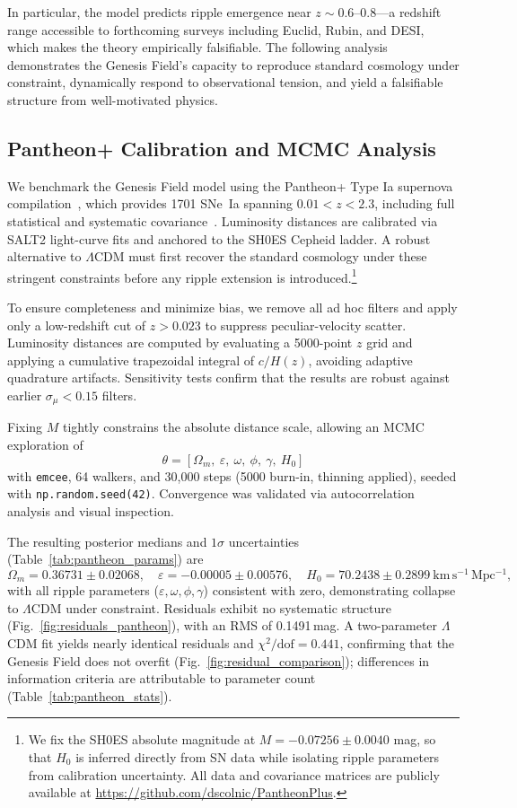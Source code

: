 In particular, the model predicts ripple emergence near $z \sim 0.6$–$0.8$—a redshift range accessible to forthcoming surveys including Euclid, Rubin, and DESI, which makes the theory empirically falsifiable. The following analysis demonstrates the Genesis Field's capacity to reproduce standard cosmology under constraint, dynamically respond to observational tension, and yield a falsifiable structure from well-motivated physics.

\subsection{Pantheon+ Calibration and MCMC Analysis}
\label{sec:pantheon}

We benchmark the Genesis Field model using the Pantheon+ Type Ia supernova compilation~\cite{Brout2022}, which provides 1701 SNe~Ia spanning $0.01 < z < 2.3$, including full statistical and systematic covariance~\cite{Scolnic2018}. Luminosity distances are calibrated via SALT2 light-curve fits and anchored to the SH0ES Cepheid ladder. A robust alternative to $\Lambda$CDM must first recover the standard cosmology under these stringent constraints before any ripple extension is introduced.\footnote{We fix the SH0ES absolute magnitude at $M = -0.07256 \pm 0.0040$ mag, so that $H_0$ is inferred directly from SN data while isolating ripple parameters from calibration uncertainty. All data and covariance matrices are publicly available at \url{https://github.com/dscolnic/PantheonPlus}.}

To ensure completeness and minimize bias, we remove all ad hoc filters and apply only a low-redshift cut of $z > 0.023$ to suppress peculiar-velocity scatter. Luminosity distances are computed by evaluating a 5000-point $z$ grid and applying a cumulative trapezoidal integral of $c/H(z)$, avoiding adaptive quadrature artifacts. Sensitivity tests confirm that the results are robust against earlier $\sigma_{\mu} < 0.15$ filters.

Fixing $M$ tightly constrains the absolute distance scale, allowing an MCMC exploration of
\[
\theta = \left[\Omega_m,\ \varepsilon,\ \omega,\ \phi,\ \gamma,\ H_0\right]
\]
with \texttt{emcee}, 64 walkers, and 30{,}000 steps (5000 burn-in, thinning applied), seeded with \texttt{np.random.seed(42)}. Convergence was validated via autocorrelation analysis and visual inspection.

The resulting posterior medians and $1\sigma$ uncertainties (Table~\ref{tab:pantheon_params}) are
\[
\Omega_m = 0.36731 \pm 0.02068,\quad
\varepsilon = -0.00005 \pm 0.00576,\quad
H_0 = 70.2438 \pm 0.2899\ \mathrm{km\,s^{-1}\,Mpc^{-1}},
\]
with all ripple parameters ($\varepsilon, \omega, \phi, \gamma$) consistent with zero, demonstrating collapse to $\Lambda$CDM under constraint. Residuals exhibit no systematic structure (Fig.~\ref{fig:residuals_pantheon}), with an RMS of 0.1491\,mag. A two-parameter $\Lambda$CDM fit yields nearly identical residuals and $\chi^2/\mathrm{dof} = 0.441$, confirming that the Genesis Field does not overfit (Fig.~\ref{fig:residual_comparison}); differences in information criteria are attributable to parameter count (Table~\ref{tab:pantheon_stats}).

